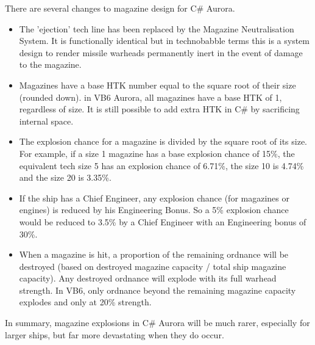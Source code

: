\documentclass[../Aurora C# unofficial manual.tex]{subfiles}
\begin{document}
	There are several changes to magazine design for C\# Aurora.
	\begin{itemize}
		\item The 'ejection' tech line has been replaced by the Magazine Neutralisation System. It is functionally identical but in technobabble terms this is a system design to render missile warheads permanently inert in the event of damage to the magazine.
		\item Magazines have a base HTK number equal to the square root of their size (rounded down). in VB6 Aurora, all magazines have a base HTK of 1, regardless of size. It is still possible to add extra HTK in C\# by sacrificing internal space.
		\item The explosion chance for a magazine is divided by the square root of its size. For example, if a size 1 magazine has a base explosion chance of 15\%, the equivalent tech size 5 has an explosion chance of 6.71\%, the size 10 is 4.74\% and the size 20 is 3.35\%.
		\item If the ship has a Chief Engineer, any explosion chance (for magazines or engines) is reduced by his Engineering Bonus. So a 5\% explosion chance would be reduced to 3.5\% by a Chief Engineer with an Engineering bonus of 30\%.
		\item When a magazine is hit, a proportion of the remaining ordnance will be destroyed (based on destroyed magazine capacity / total ship magazine capacity). Any destroyed ordnance will explode with its full warhead strength.  In VB6, only ordnance beyond the remaining magazine capacity explodes and only at 20\% strength.
	\end{itemize}	
	In summary, magazine explosions in C\# Aurora will be much rarer, especially for larger ships, but far more devastating when they do occur.
\end{document}
